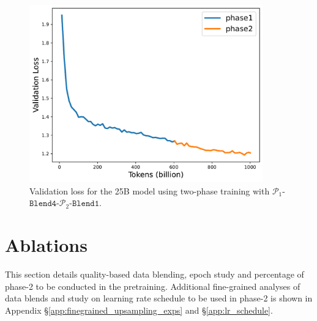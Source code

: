 \documentclass[11pt]{article}
\newcommand{\phaseone}{$\mathcal{P}_1$\xspace}
\newcommand{\phasetwo}{$\mathcal{P}_2$\xspace}
\newcommand{\ponebfourptwobone}{\phaseone-$\mathtt{Blend4}$-\phasetwo-$\mathtt{Blend1}$\xspace}
\begin{document}
\begin{table}[t]%
\begin{center}
\end{center}
\caption[]{
Evaluation results for 8B vs. 25B parameter models, using the same blend: \ponebfourptwobone. Note that we use a maximum sequence length of 8192 (instead of 4096) for both models here.
\label{tab:25B-results}}
\end{table}

\begin{figure}[t]
    \centering
    \includegraphics[width=0.9\textwidth]{figures/25b_validation_loss.pdf}
    \caption{Validation loss for the 25B model using two-phase training with \ponebfourptwobone. \label{fig:25B-val-loss}}
\end{figure}

\section{Ablations}
\label{sec:ablations}

This section details quality-based data blending, epoch study and percentage of phase-2 to be conducted in the pretraining.
Additional fine-grained analyses of data blends and study on learning rate schedule to be used in phase-2 is shown in Appendix \S\ref{app:finegrained_upsampling_exps} and \S\ref{app:lr_schedule}.
\end{document}
